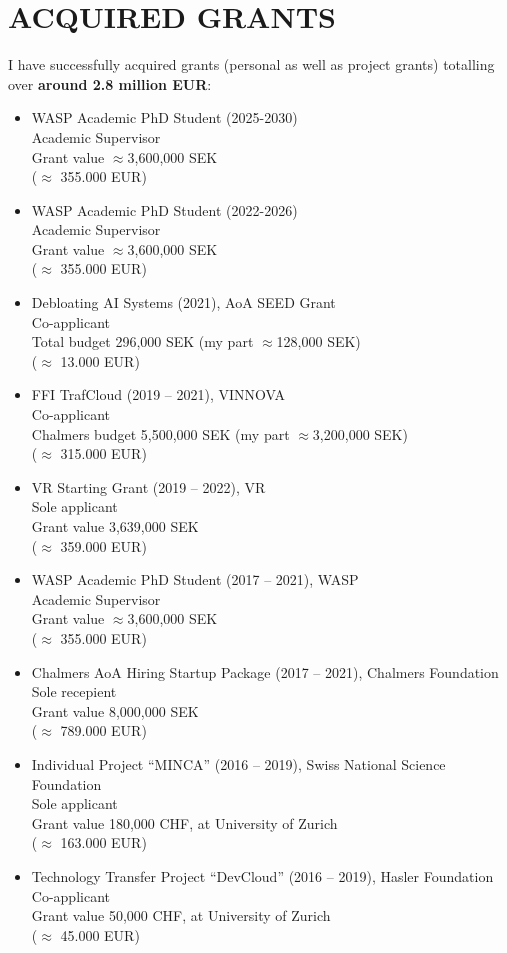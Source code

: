 \documentclass[paper=letter,fontsize=11pt]{scrartcl} %
\newcommand{\NewPart}[2]{\section*{\uppercase{#1} #2}}
\begin{document}
\newpage

\NewPart{Acquired Grants}{}

I have successfully acquired grants (personal as well as project grants) totalling over \textbf{around 2.8 million EUR}:

\begin{itemize}
  \item WASP Academic PhD Student (2025-2030)\\
  Academic Supervisor\\
  Grant value $\approx$3,600,000 SEK\\
  ($\approx$ 355.000 EUR)  
  \item WASP Academic PhD Student (2022-2026)\\
  Academic Supervisor\\
  Grant value $\approx$3,600,000 SEK\\
  ($\approx$ 355.000 EUR)
  \item Debloating AI Systems (2021), AoA SEED Grant\\
  Co-applicant\\
  Total budget 296,000 SEK (my part $\approx$128,000 SEK)\\
  ($\approx$ 13.000 EUR)
	\item FFI TrafCloud (2019 -- 2021), VINNOVA\\
	Co-applicant\\
	Chalmers budget 5,500,000 SEK (my part $\approx$3,200,000 SEK)\\
  ($\approx$ 315.000 EUR)
  \item VR Starting Grant (2019 -- 2022), VR\\
  Sole applicant\\
	Grant value 3,639,000 SEK\\
  ($\approx$ 359.000 EUR)
  \item WASP Academic PhD Student (2017 -- 2021), WASP\\
  Academic Supervisor\\
	Grant value $\approx$3,600,000 SEK\\
  ($\approx$ 355.000 EUR)
  \item Chalmers AoA Hiring Startup Package (2017 -- 2021), Chalmers Foundation\\
	Sole recepient\\
  Grant value 8,000,000 SEK\\
  ($\approx$ 789.000 EUR)
  \item Individual Project ``MINCA'' (2016 -- 2019), Swiss National Science Foundation\\
  Sole applicant \\
  Grant value 180,000 CHF, at University of Zurich\\
  ($\approx$ 163.000 EUR)
  \item Technology Transfer Project ``DevCloud'' (2016 -- 2019), Hasler Foundation\\
  Co-applicant \\
  Grant value 50,000 CHF, at University of Zurich\\
  ($\approx$ 45.000 EUR)
\end{itemize}
\end{document}
